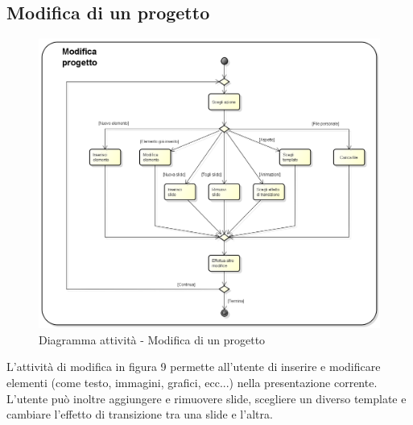 \subsection{Modifica di un progetto}
\begin{figure}[h] 
	\centering 
	\includegraphics[scale=0.3] {img/activity_modifica.png} 
	\caption{Diagramma attività - Modifica di un progetto} 
\end{figure}
L'attività di modifica in figura 9 permette all'utente di inserire e modificare elementi (come testo, immagini, grafici, ecc...) nella presentazione corrente. L'utente può inoltre aggiungere e rimuovere slide, scegliere un diverso template e cambiare l'effetto di transizione tra una slide e l'altra.
\newpage

